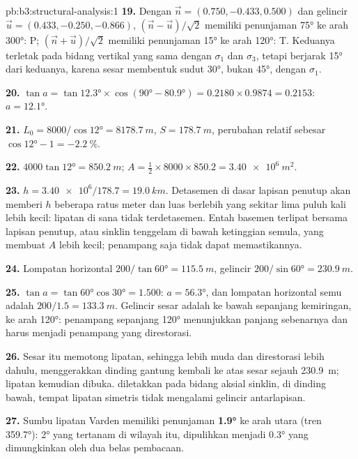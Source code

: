 \begin{solution}{pb:b3:structural-analysis:1}
\textbf{19.} Dengan $\vec n = (0.750, -0.433, 0.500)$ dan gelincir $\vec u =
(0.433, -0.250, -0.866)$, $(\vec n - \vec u)/\sqrt2$ memiliki penunjaman \ang{75} ke arah
\ang{300}: P; $(\vec n + \vec u)/\sqrt2$ memiliki penunjaman \ang{15} ke arah \ang{120}:
T. Keduanya terletak pada bidang vertikal yang sama dengan $\sigma_1$ dan $\sigma_3$, tetapi
berjarak \ang{15} dari keduanya, karena sesar membentuk sudut \ang{30}, bukan \ang{45}, dengan
$\sigma_1$.

\textbf{20.} $\tan a = \tan\ang{12.3}\times\cos(\ang{90} - \ang{80.9}) =
0.2180\times0.9874 = 0.2153$: $a = \ang{12.1}$.

\textbf{21.} $L_0 = 8000/\cos\ang{12} = \qty{8178.7}{m}$, $S =
\qty{178.7}{m}$, perubahan relatif sebesar $\cos\ang{12} - 1 =
\qty{-2.2}{\percent}$.

\textbf{22.} $4000\tan\ang{12} = \qty{850.2}{m}$; $A = \tfrac12\times8000\times
850.2 = \qty{3.40e6}{m^2}$.

\textbf{23.} $h = \num{3.40e6}/178.7 = \qty{19.0}{km}$. Detasemen di
dasar lapisan penutup akan memberi $h$ beberapa ratus meter dan luas berlebih
yang sekitar lima puluh kali lebih kecil: lipatan di sana tidak terdetasemen. Entah
basemen terlipat bersama lapisan penutup, atau sinklin tenggelam di bawah
ketinggian semula, yang membuat $A$ lebih kecil; penampang saja tidak dapat memastikannya.

\textbf{24.} Lompatan horizontal $200/\tan\ang{60} = \qty{115.5}{m}$, gelincir $200/\sin\ang{60}
= \qty{230.9}{m}$.

\textbf{25.} $\tan a = \tan\ang{60}\cos\ang{30} = 1.500$: $a = \ang{56.3}$, dan
lompatan horizontal semu adalah $200/1.5 = \qty{133.3}{m}$. Gelincir sesar
adalah ke bawah sepanjang kemiringan, ke arah \ang{120}: penampang sepanjang \ang{120} menunjukkan
panjang sebenarnya dan harus menjadi penampang yang direstorasi.

\textbf{26.} Sesar itu memotong lipatan, sehingga lebih muda dan direstorasi lebih dahulu,
menggerakkan dinding gantung kembali ke atas sesar sejauh \qty{230.9}{m}; lipatan
kemudian dibuka.  diletakkan pada bidang aksial sinklin, di
dinding bawah, tempat lipatan simetris tidak mengalami gelincir antarlapisan.

\textbf{27.} Sumbu lipatan Varden memiliki penunjaman
\textbf{\ang[text-series-to-math=true]{1.9}} ke arah utara (tren
\ang{359.7}): \ang{2} yang tertanam di wilayah itu, dipulihkan menjadi
\ang{0.3} yang dimungkinkan oleh dua belas pembacaan.
\end{solution}

